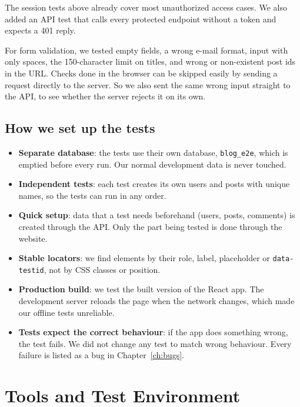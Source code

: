 \documentclass[12pt,a4paper,oneside]{report}
\newcommand{\code}[1]{\texttt{#1}}
\begin{document}
The session tests above already cover most unauthorized access cases. We also
added an API test that calls every protected endpoint without a token and
expects a 401 reply.

For form validation, we tested empty fields, a wrong e-mail format, input with
only spaces, the 150-character limit on titles, and wrong or non-existent post
ids in the URL. Checks done in the browser can be skipped easily by sending a
request directly to the server. So we also sent the same wrong input straight
to the API, to see whether the server rejects it on its own.

\section{How we set up the tests}

\begin{itemize}[nosep]
  \item \textbf{Separate database}: the tests use their own database,
        \code{blog\_e2e}, which is emptied before every run. Our normal
        development data is never touched.
  \item \textbf{Independent tests}: each test creates its own users and posts
        with unique names, so the tests can run in any order.
  \item \textbf{Quick setup}: data that a test needs beforehand (users, posts,
        comments) is created through the API. Only the part being tested is
        done through the website.
  \item \textbf{Stable locators}: we find elements by their role, label,
        placeholder or \code{data-testid}, not by CSS classes or position.
  \item \textbf{Production build}: we test the built version of the React app.
        The development server reloads the page when the network changes,
        which made our offline tests unreliable.
  \item \textbf{Tests expect the correct behaviour}: if the app does something
        wrong, the test fails. We did not change any test to match wrong
        behaviour. Every failure is listed as a bug in Chapter~\ref{ch:bugs}.
\end{itemize}

\chapter{Tools and Test Environment}\label{ch:tools}
\end{document}
